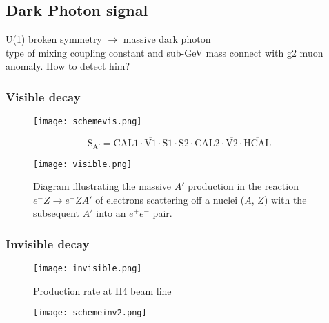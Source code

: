 \subsection{Dark Photon signal}

U(1) broken symmetry $\longrightarrow$ massive dark photon\\
type of mixing
coupling constant and sub-GeV mass connect with g2 muon anomaly.
How to detect him?
\subsubsection{Visible decay}


\begin{figure}[ht]
	\hspace*{\fill}
	\centering
	\texttt{[image: schemevis.png]}
	\hspace*{\fill}
	\caption{}
	\label{fig:schemevis}
\end{figure}

\begin{equation}
\mathrm{S_{A'} = CAL1 \cdot \overline{V1}\cdot S1\cdot S2\cdot CAL2\cdot \overline{V2}\cdot\overline{HCAL}}
\end{equation}

\begin{figure}[ht]
	\hspace*{\fill}
	\centering
	\texttt{[image: visible.png]}
	\hspace*{\fill}
	\caption{Diagram illustrating the massive $A'$ production in the reaction $e^-Z\rightarrow e^-ZA'$ of electrons
	scattering off a nuclei ($A$, $Z$) with the subsequent $A'$ into an $e^+e^-$ pair.}\label{fig:vis}
\end{figure}


\subsubsection{Invisible decay}
\begin{figure}[ht]
	\hspace*{\fill}
	\centering
	\texttt{[image: invisible.png]}
	\hspace*{\fill}
	\caption{Production rate at H4 beam line}\label{fig:inv}
\end{figure}

\begin{figure}[ht]
	\hspace*{\fill}
	\centering
	\texttt{[image: schemeinv2.png]}
	\hspace*{\fill}
	\caption{}\label{fig:schemeinv}
\end{figure}

